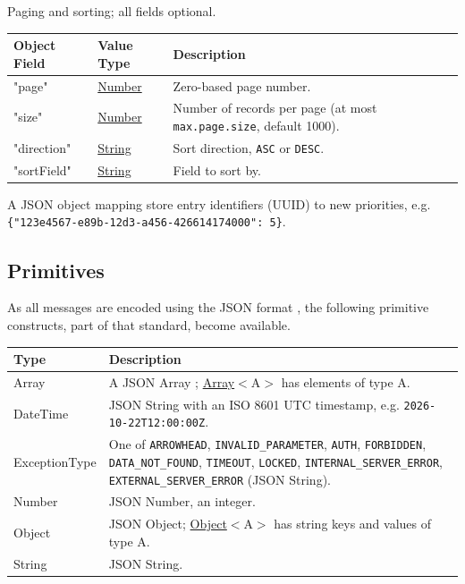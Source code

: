 \documentclass[a4paper]{arrowhead}
\newcommand{\pdef}[1]{{\textcolor{ArrowheadGrey}{#1 \label{sec:model:primitives:#1} \label{sec:model:primitives:#1s}}}}
\newcommand{\pref}[1]{{\textcolor{ArrowheadGrey}{\hyperref[sec:model:primitives:#1]{#1}}}}
\begin{document}

Paging and sorting; all fields optional.


\noindent\begin{tabularx}{\textwidth}{| >{\raggedright\arraybackslash}p{3.9cm} | >{\raggedright\arraybackslash\small}p{5.3cm} | X |} \hline
\rowcolor{gray!33} Object Field & Value Type & Description \\ \hline
"page" & \pref{Number} & Zero-based page number. \\ \hline
"size" & \pref{Number} & Number of records per page (at most \texttt{max.\allowbreak{}page.\allowbreak{}size}, default 1000). \\ \hline
"direction" & \pref{String} & Sort direction, \texttt{ASC} or \texttt{DESC}. \\ \hline
"sort\allowbreak{}Field" & \pref{String} & Field to sort by. \\ \hline
\end{tabularx}




A JSON object mapping store entry identifiers (UUID) to new priorities, e.g. \texttt{\{"123e4567-\allowbreak{}e89b-\allowbreak{}12d3-\allowbreak{}a456-\allowbreak{}426614174000": 5\}}.



\subsection{Primitives}
\label{sec:model:primitives}

As all messages are encoded using the JSON format \cite{rfc8259}, the following primitive constructs, part of that standard, become available.

\noindent\begin{tabularx}{\textwidth}{| p{4.6cm} | X |} \hline
\rowcolor{gray!33} Type & Description \\ \hline
\pdef{Array} & A JSON Array \cite{rfc8259}; \pref{Array}$<$A$>$ has elements of type A. \\ \hline
\pdef{DateTime} & JSON String with an ISO 8601 UTC timestamp, e.g. \texttt{2026-10-22T12:00:00Z}. \\ \hline
\pdef{ExceptionType} & One of \texttt{ARROWHEAD}, \texttt{INVALID\_\allowbreak{}PARAMETER}, \texttt{AUTH}, \texttt{FORBIDDEN}, \texttt{DATA\_\allowbreak{}NOT\_\allowbreak{}FOUND}, \texttt{TIMEOUT}, \texttt{LOCKED}, \texttt{INTERNAL\_\allowbreak{}SERVER\_\allowbreak{}ERROR}, \texttt{EXTERNAL\_\allowbreak{}SERVER\_\allowbreak{}ERROR} (JSON String). \\ \hline
\pdef{Number} & JSON Number, an integer. \\ \hline
\pdef{Object} & JSON Object; \pref{Object}$<$A$>$ has string keys and values of type A. \\ \hline
\pdef{String} & JSON String. \\ \hline
\end{tabularx}
\end{document}
